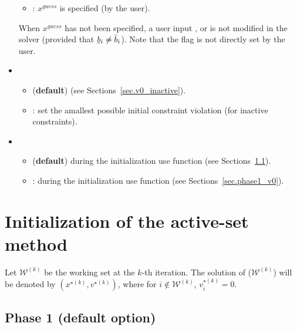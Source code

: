 \documentclass[12pt,a4paper]{article}
\newcommand{\ubar}[1]{\underaccent{\bar}{#1}}
\begin{document}
\begin{itemize}
\begin{itemize}
  \item[\ding{237}] : $x^{\mathit{guess}}$ is specified (by the user).

  \end{itemize} 

  \noindent When $x^{\mathit{guess}}$ has not been specified, a user input ,
   or  is not modified in the solver (provided that
  $\ubar{b}_i \neq \bar{b}_i$). Note that the flag  is not directly set
  by the user.

\item {}

  \begin{itemize}
  \item[\ding{237}]  ({\bf default}) (see Sections~\ref{sec.v0_inactive}).

  \item[\ding{237}] : set the amallest possible initial constraint violation (for inactive constraints).
  \end{itemize} 

\item {}

  \begin{itemize}
  \item[\ding{237}]  ({\bf default}) during the initialization use function  (see Sections~\ref{sec.phase1}).

  \item[\ding{237}] : during the initialization use function  (see Sections~\ref{sec.phase1_v0}).
  \end{itemize} 
  
\end{itemize}

\clearpage

\section{Initialization of the active-set method}

Let $\mathcal{W}^{(k)}$ be the working set at the $k$-th iteration. The solution of
($\mathcal{W}^{(k)}$) will be denoted by $(x^{\star(k)},v^{\star(k)})$, where for
$i\not\in \mathcal{W}^{(k)}$, $v_i^{\star(k)} = 0$.

\subsection{Phase 1 (default option)} \label{sec.phase1}
\end{document}
